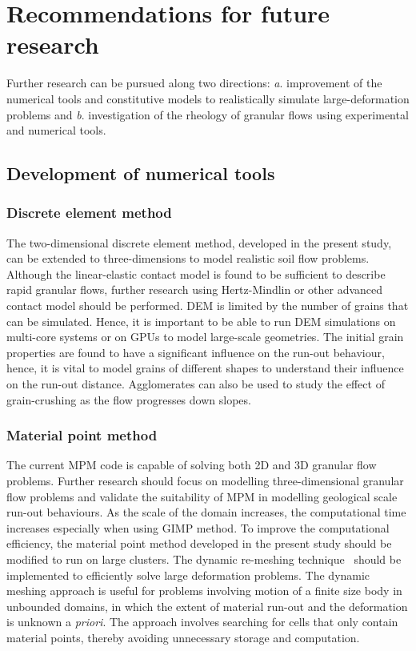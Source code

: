 \section{Recommendations for future research}

Further research can be pursued along two directions: \textit{a}. improvement 
of the numerical tools and constitutive models to realistically simulate 
large-deformation problems and \textit{b}. investigation of the rheology of 
granular flows using experimental and numerical tools.

\subsection{Development of numerical tools}

\subsubsection*{Discrete element method}

The two-dimensional discrete element method, developed in the present study, 
can be extended to three-dimensions to model realistic soil flow 
problems. Although the linear-elastic contact model is found to be sufficient 
to 
describe rapid granular flows, further research using Hertz-Mindlin or other 
advanced contact model should be performed. DEM is limited by the number of 
grains that can be simulated. Hence, it is important to be able to run DEM 
simulations on multi-core systems or on GPUs to model large-scale geometries. 
The initial grain properties are found to have a 
significant influence on the run-out behaviour, hence, it is vital to model 
grains of different shapes to understand their influence on the run-out 
distance. Agglomerates can also be used to study the effect of grain-crushing 
as the flow progresses down slopes.

\subsubsection*{Material point method}

The current MPM code is capable of solving both 2D and 3D granular flow 
problems. Further research should focus on modelling three-dimensional granular 
flow problems and validate the suitability of MPM in modelling geological scale 
run-out behaviours. As the scale of the domain increases, the computational 
time increases especially when using GIMP method. To improve the computational 
efficiency, the material point method developed in the present study should be 
modified to run on large clusters. The dynamic re-meshing 
technique~\citep{Shin2010a} should be implemented to efficiently solve 
large deformation problems. The dynamic meshing approach is useful for problems 
involving motion of a finite size body in unbounded domains, in which the 
extent of material run-out and the deformation is unknown a \textit{priori}. 
The approach involves searching for cells that only contain material points, 
thereby avoiding unnecessary storage and computation. 

